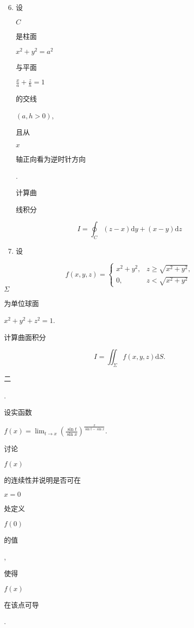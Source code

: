 \documentclass[10pt]{article}
\begin{document}
\begin{enumerate}
  \setcounter{enumi}{5}
  \item \begin{CJK}{UTF8}{mj}设\end{CJK} $C$ \begin{CJK}{UTF8}{mj}是柱面\end{CJK} $x^{2}+y^{2}=a^{2}$ \begin{CJK}{UTF8}{mj}与平面\end{CJK} $\frac{x}{a}+\frac{z}{h}=1$ \begin{CJK}{UTF8}{mj}的交线\end{CJK} $(a, h>0)$, \begin{CJK}{UTF8}{mj}且从\end{CJK} $x$ \begin{CJK}{UTF8}{mj}轴正向看为逆时针方向\end{CJK}. \begin{CJK}{UTF8}{mj}计算曲\end{CJK} \begin{CJK}{UTF8}{mj}线积分\end{CJK}
\end{enumerate}
$$
I=\oint_{C}(z-x) \mathrm{d} y+(x-y) \mathrm{d} z
$$

\begin{enumerate}
  \setcounter{enumi}{6}
  \item \begin{CJK}{UTF8}{mj}设\end{CJK}
\end{enumerate}
$$
f(x, y, z)= \begin{cases}x^{2}+y^{2}, & z \geqslant \sqrt{x^{2}+y^{2}}, \\ 0, & z<\sqrt{x^{2}+y^{2}}\end{cases}
$$
$\Sigma$ \begin{CJK}{UTF8}{mj}为单位球面\end{CJK} $x^{2}+y^{2}+z^{2}=1$. \begin{CJK}{UTF8}{mj}计算曲面积分\end{CJK}
$$
I=\iint_{\Sigma} f(x, y, z) \mathrm{d} S .
$$
\begin{CJK}{UTF8}{mj}二\end{CJK}. \begin{CJK}{UTF8}{mj}设实函数\end{CJK} $f(x)=\lim _{t \rightarrow x}\left(\frac{\sin t}{\sin x}\right)^{\frac{x}{\sin t-\sin x}}$. \begin{CJK}{UTF8}{mj}讨论\end{CJK} $f(x)$ \begin{CJK}{UTF8}{mj}的连续性并说明是否可在\end{CJK} $x=0$ \begin{CJK}{UTF8}{mj}处定义\end{CJK} $f(0)$ \begin{CJK}{UTF8}{mj}的值\end{CJK}, \begin{CJK}{UTF8}{mj}使得\end{CJK} $f(x)$ \begin{CJK}{UTF8}{mj}在该点可导\end{CJK}.
\end{document}
